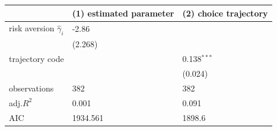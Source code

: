 \begin{tabular}{lll}
\hline
 & (1) estimated parameter & (2) choice trajectory \\
\hline
risk aversion $\hat{\gamma}_i$ & -2.86 &  \\
 & (2.268) &  \\
trajectory code &  & 0.138$^{***}$ \\
 &  & (0.024) \\
observations & 382 & 382 \\
adj.$R^2$ & 0.001 & 0.091 \\
AIC & 1934.561 & 1898.6 \\
\hline
\end{tabular}
